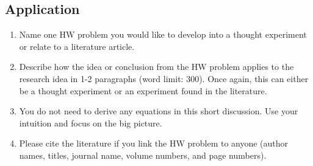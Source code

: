 \documentclass[../psets.tex]{subfiles}
\begin{document}
\subsection*{Application}
\begin{enumerate}[label={\arabic*)}]
    \item Name one HW problem you would like to develop into a thought experiment or relate to a literature article.
    \item Describe how the idea or conclusion from the HW problem applies to the research idea in 1-2 paragraphs (word limit: 300). Once again, this can either be a thought experiment or an experiment found in the literature.
    \item You do not need to derive any equations in this short discussion. Use your intuition and focus on the big picture.
    \item Please cite the literature if you link the HW problem to anyone (author names, titles, journal name, volume numbers, and page numbers).
\end{enumerate}
\end{document}

